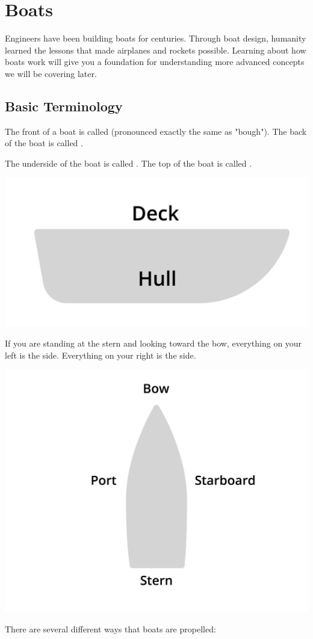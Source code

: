 \chapter{Boats}

Engineers have been building boats for centuries.  Through boat design, humanity learned the lessons that made airplanes and rockets possible.
Learning about how boats work will give you a foundation for understanding more advanced concepts we will be covering later.

\section{Basic Terminology}
The front of a boat is called  (pronounced exactly the same as "bough"). The back of the boat is called .

The underside of the boat is called .  The top of the boat is called .

\begin{center}
    \includegraphics[width=.75\textwidth]{deckHull.png}

\end{center}

If you are standing at the stern and looking toward the bow, everything on your left is the  side.  Everything on your right is the  side.

\begin{center}
    \includegraphics[width=.75\textwidth]{bowStern.png}

\end{center}
There are several different ways that boats are propelled:

